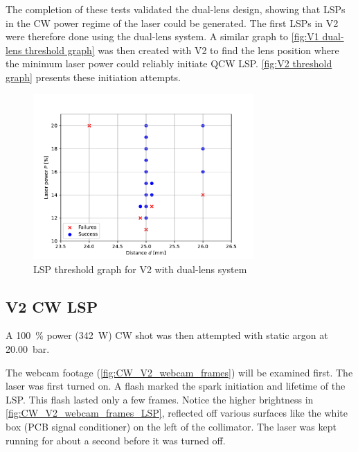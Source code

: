             The completion of these tests validated the dual-lens design, showing that LSPs in the CW power regime of the laser could be generated. The first LSPs in V2 were therefore done using the dual-lens system. A similar graph to \autoref{fig:V1 dual-lens threshold graph} was then created with V2 to find the lens position where the minimum laser power could reliably initiate QCW LSP. \autoref{fig:V2 threshold graph} presents these initiation attempts.
            \begin{figure}[!ht]
                \centering
                \includegraphics[width=0.75\textwidth]{assets/4 experiments/V2_focus_threshold.pdf}
                \caption{LSP threshold graph for V2 with dual-lens system}
                \label{fig:V2 threshold graph}
            \end{figure}

        \subsection{V2 CW LSP}

            A \qty{100}{\%} power (\qty{342}{W}) CW shot was then attempted with static argon at \qty{20.00}{bar}. 

            

            The webcam footage (\autoref{fig:CW_V2_webcam_frames}) will be examined first. The laser was first turned on. A flash marked the spark initiation and lifetime of the LSP. This flash lasted only a few frames. Notice the higher brightness in \autoref{fig:CW_V2_webcam_frames_LSP}, reflected off various surfaces like the white box (PCB signal conditioner) on the left of the collimator. The laser was kept running for about a second before it was turned off.

